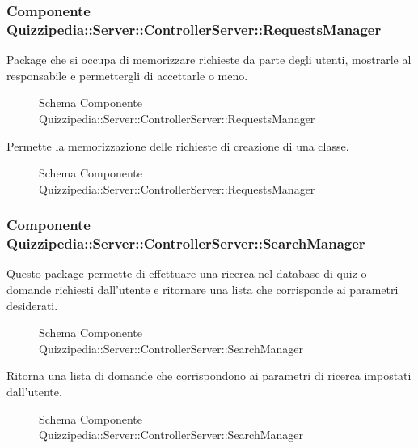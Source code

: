\subsubsection{Componente Quizzipedia::Server::ControllerServer::RequestsManager}
Package che si occupa di memorizzare richieste da parte degli utenti, mostrarle al responsabile e permettergli di accettarle o meno.
\begin{figure}[H]
\centering
\noindent{}
\caption{Schema Componente Quizzipedia::Server::ControllerServer::RequestsManager}
\end{figure}
Permette la memorizzazione delle richieste di creazione di una classe.
\begin{figure}[H]
\centering
\noindent{}
\caption{Schema Componente Quizzipedia::Server::ControllerServer::RequestsManager}
\end{figure}
\subsubsection{Componente Quizzipedia::Server::ControllerServer::SearchManager}
Questo package permette di effettuare una ricerca nel database di quiz o domande richiesti dall'utente e ritornare una lista che corrisponde ai parametri desiderati.
\begin{figure}[H]
\centering
\noindent{}
\caption{Schema Componente Quizzipedia::Server::ControllerServer::SearchManager}
\end{figure}
Ritorna una lista di domande che corrispondono ai parametri di ricerca impostati dall'utente.
\begin{figure}[H]
\centering
\noindent{}
\caption{Schema Componente Quizzipedia::Server::ControllerServer::SearchManager}
\end{figure}
